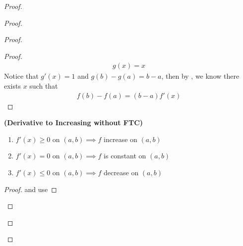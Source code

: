 \documentclass{report}
\begin{document}
\begin{proof}
\begin{proof}
\begin{proof}
\begin{proof}
\begin{align*}
g(x)=x
\end{align*}
Notice that $g'(x)=1$ and $g(b)-g(a)=b-a$, then by , we know there exists $x$ such that 
\begin{align*}
f(b)-f(a)=(b-a)f'(x)
\end{align*}
\end{proof}
\begin{corollary}
\label{6.2.6}
\textbf{(Derivative to Increasing without FTC)} 
\begin{enumerate}[label=(\alph*)]
  \item $f'(x)\geq 0$ on $(a,b)\implies f$ increase on $(a,b)$   
  \item  $f'(x)=0$ on $(a,b)\implies f$ is constant on $(a,b)$ 
  \item  $f'(x)\leq 0$ on $(a,b)\implies f$ decrease on $(a,b)$
\end{enumerate}
\end{corollary}
\begin{proof}
 and use 
\end{proof}

\end{proof}
\end{proof}
\end{proof}
\end{document}
